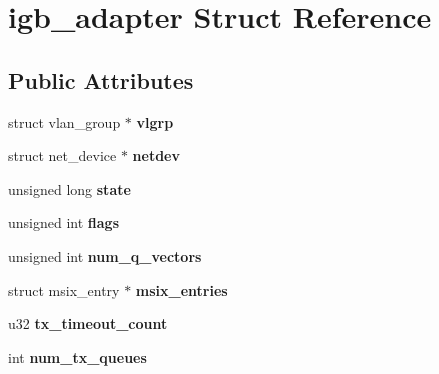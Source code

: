 \hypertarget{structigb__adapter}{
\section{igb\_\-adapter Struct Reference}
\label{structigb__adapter}
}
\subsection*{Public Attributes}
\begin{DoxyCompactItemize}
\item 
\hypertarget{structigb__adapter_a5450f27f2700fa668c06c60ccce3f701}{
struct vlan\_\-group $\ast$ {\bfseries vlgrp}}
\label{structigb__adapter_a5450f27f2700fa668c06c60ccce3f701}

\item 
\hypertarget{structigb__adapter_ac6a252d597b9250ce1d73153fe0efd59}{
struct net\_\-device $\ast$ {\bfseries netdev}}
\label{structigb__adapter_ac6a252d597b9250ce1d73153fe0efd59}

\item 
\hypertarget{structigb__adapter_afe50c4c4ad82bec0d4dcf4baa4e4492d}{
unsigned long {\bfseries state}}
\label{structigb__adapter_afe50c4c4ad82bec0d4dcf4baa4e4492d}

\item 
\hypertarget{structigb__adapter_a05cd2f37e2520d8210288638201c9b12}{
unsigned int {\bfseries flags}}
\label{structigb__adapter_a05cd2f37e2520d8210288638201c9b12}

\item 
\hypertarget{structigb__adapter_abde2e24ed0ec891365057797ae275efe}{
unsigned int {\bfseries num\_\-q\_\-vectors}}
\label{structigb__adapter_abde2e24ed0ec891365057797ae275efe}

\item 
\hypertarget{structigb__adapter_a04c035286f6384dec226ebb528f83369}{
struct msix\_\-entry $\ast$ {\bfseries msix\_\-entries}}
\label{structigb__adapter_a04c035286f6384dec226ebb528f83369}

\item 
\hypertarget{structigb__adapter_afd2b702c1ce7501b3482a7ae2ade96db}{
u32 {\bfseries tx\_\-timeout\_\-count}}
\label{structigb__adapter_afd2b702c1ce7501b3482a7ae2ade96db}

\item 
\hypertarget{structigb__adapter_a9889e727e4c3a962a1930e5da754092f}{
int {\bfseries num\_\-tx\_\-queues}}
\label{structigb__adapter_a9889e727e4c3a962a1930e5da754092f}


\end{DoxyCompactItemize}
